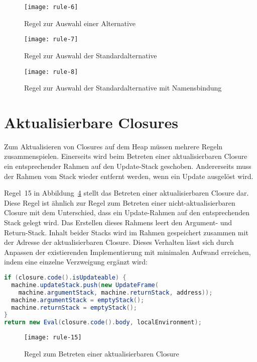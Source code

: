 \begin{figure}
  \centering
  \texttt{[image: rule-6]}
  \caption{Regel zur Auswahl einer Alternative}\label{fig:rule-6}
\end{figure}

\begin{figure}
  \centering
  \texttt{[image: rule-7]}
  \caption{Regel zur Auswahl der Standardalternative}\label{fig:rule-7}
\end{figure}

\begin{figure}
  \centering
  \texttt{[image: rule-8]}
  \caption{Regel zur Auswahl der Standardalternative mit Namensbindung}\label{fig:rule-8}
\end{figure}


\section{Aktualisierbare Closures}\label{sec:updateable-closures}

Zum Aktualisieren von Closures auf dem Heap müssen mehrere Regeln zusammenspielen.
Einerseits wird beim Betreten einer aktualisierbaren Closure ein entsprechender Rahmen auf den Update-Stack geschoben.
Andererseits muss der Rahmen vom Stack wieder entfernt werden, wenn ein Update ausgelöst wird.

Regel~15 in Abbildung~\ref{fig:rule-15} stellt das Betreten einer aktualisierbaren Closure dar.
Diese Regel ist ähnlich zur Regel zum Betreten einer nicht-aktualisierbaren Closure mit dem Unterschied, dass ein Update-Rahmen auf den entsprechenden Stack gelegt wird.
Das Erstellen dieses Rahmens leert den Argument- und Return-Stack.
Inhalt beider Stacks wird im Rahmen gespeichert zusammen mit der Adresse der aktualisierbaren Closure.
Dieses Verhalten lässt sich durch Anpassen der existierenden Implementierung mit minimalen Aufwand erreichen, indem eine einzelne Verzweigung ergänzt wird:

\begin{lstlisting}[language=java]
if (closure.code().isUpdateable) {
  machine.updateStack.push(new UpdateFrame(
    machine.argumentStack, machine.returnStack, address));
  machine.argumentStack = emptyStack();
  machine.returnStack = emptyStack();
}
return new Eval(closure.code().body, localEnvironment);
\end{lstlisting}

\begin{figure}[h]
  \centering
  \texttt{[image: rule-15]}
  \caption{Regel zum Betreten einer aktualisierbaren Closure}\label{fig:rule-15}
\end{figure}


